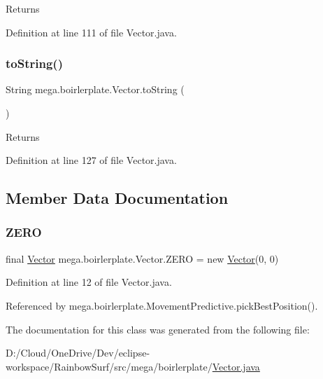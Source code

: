 \begin{DoxyReturn}{Returns}

\end{DoxyReturn}


Definition at line 111 of file Vector.\+java.

\mbox{\label{classmega_1_1boirlerplate_1_1_vector_af6635de7cd12afcffc0bb1d54217c798}} 
\subsubsection{\texorpdfstring{to\+String()}{toString()}}
{\footnotesize\ttfamily String mega.\+boirlerplate.\+Vector.\+to\+String (\begin{DoxyParamCaption}{ }\end{DoxyParamCaption})}

\begin{DoxyReturn}{Returns}

\end{DoxyReturn}


Definition at line 127 of file Vector.\+java.



\subsection{Member Data Documentation}
\mbox{\label{classmega_1_1boirlerplate_1_1_vector_ace091045275abf9589abee130d04aeb3}} 
\subsubsection{\texorpdfstring{Z\+E\+RO}{ZERO}}
{\footnotesize\ttfamily final \hyperlink{classmega_1_1boirlerplate_1_1_vector}{Vector} mega.\+boirlerplate.\+Vector.\+Z\+E\+RO = new \hyperlink{classmega_1_1boirlerplate_1_1_vector}{Vector}(0, 0)\hspace{0.3cm}{\ttfamily [static]}}



Definition at line 12 of file Vector.\+java.



Referenced by mega.\+boirlerplate.\+Movement\+Predictive.\+pick\+Best\+Position().



The documentation for this class was generated from the following file\+:\begin{DoxyCompactItemize}
\item 
D\+:/\+Cloud/\+One\+Drive/\+Dev/eclipse-\/workspace/\+Rainbow\+Surf/src/mega/boirlerplate/\hyperlink{_vector_8java}{Vector.\+java}\end{DoxyCompactItemize}
